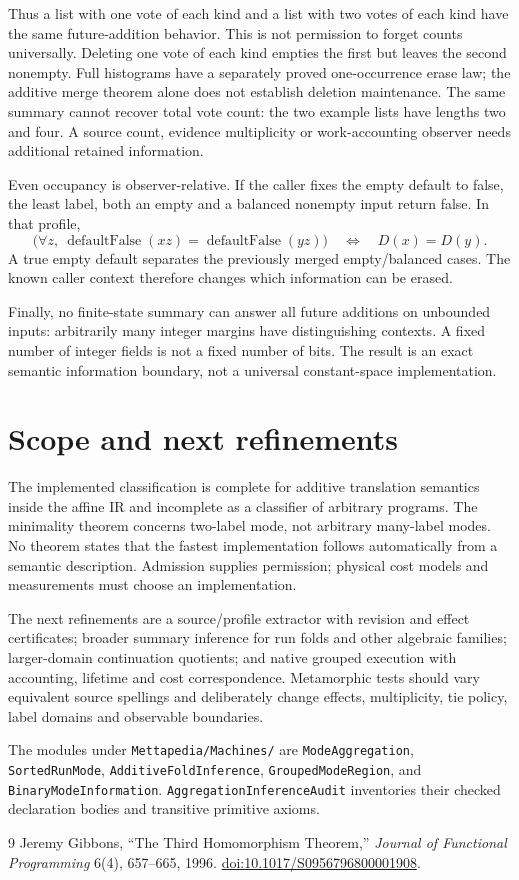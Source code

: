\documentclass[11pt,a4paper]{article}
\newcommand{\code}[1]{\nolinkurl{#1}}
\begin{document}
Thus a list with one vote of each kind and a list with two votes of each kind
have the same future-addition behavior. This is not permission to forget counts
universally. Deleting one vote of each kind empties the first but leaves the second
nonempty. Full histograms have a separately proved one-occurrence erase law;
the additive merge theorem alone does not establish deletion maintenance.
The same summary cannot recover total vote count: the two example lists have
lengths two and four. A source count, evidence multiplicity or work-accounting
observer needs additional retained information.

Even occupancy is observer-relative. If the caller fixes the empty default
to false, the least label, both an empty and a balanced nonempty input return
false. In that profile,
\[
 \bigl(\forall z,\ \operatorname{defaultFalse}(xz)
                  =\operatorname{defaultFalse}(yz)\bigr)
 \quad\Longleftrightarrow\quad D(x)=D(y).
\]
A true empty default separates the previously merged empty/balanced cases.
The known caller context therefore changes which information can be erased.

Finally, no finite-state summary can answer all future additions on unbounded
inputs: arbitrarily many integer margins have distinguishing contexts. A fixed
number of integer fields is not a fixed number of bits. The result is an exact
semantic information boundary, not a universal constant-space implementation.

\section{Scope and next refinements}

The implemented classification is complete for additive translation semantics
inside the affine IR and incomplete as a classifier of arbitrary programs.
The minimality theorem concerns two-label mode, not arbitrary many-label modes.
No theorem states that the fastest implementation follows automatically from
a semantic description. Admission supplies permission; physical cost models
and measurements must choose an implementation.

The next refinements are a source/profile extractor with revision and effect
certificates; broader summary inference for run folds and other algebraic
families; larger-domain continuation quotients; and native grouped execution
with accounting, lifetime and cost correspondence. Metamorphic tests should
vary equivalent source spellings and deliberately change effects, multiplicity,
tie policy, label domains and observable boundaries.

The modules under \code{Mettapedia/Machines/} are \code{ModeAggregation},
\code{SortedRunMode}, \code{AdditiveFoldInference}, \code{GroupedModeRegion},
and \code{BinaryModeInformation}. \code{AggregationInferenceAudit} inventories
their checked declaration bodies and transitive primitive axioms.

\begin{thebibliography}{9}
 Jeremy Gibbons, ``The Third Homomorphism Theorem,''
\emph{Journal of Functional Programming} 6(4), 657--665, 1996.
\href{https://doi.org/10.1017/S0956796800001908}{doi:10.1017/S0956796800001908}.
\end{thebibliography}
\end{document}
